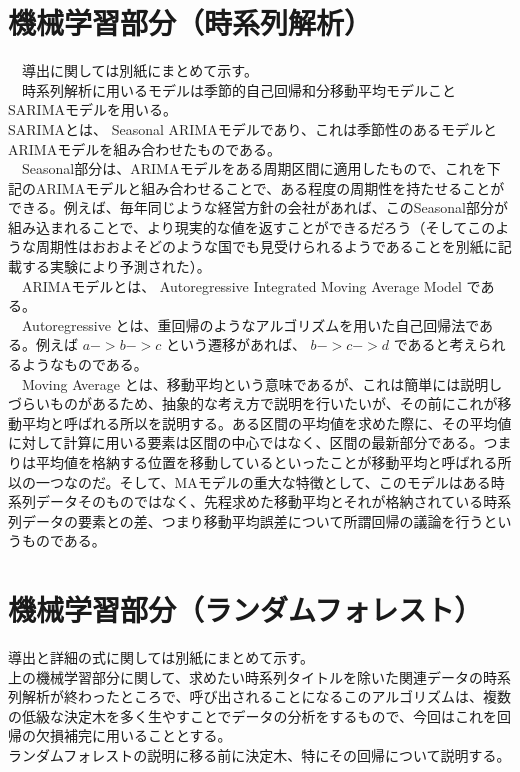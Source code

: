 \documentclass{scrartcl}
\begin{document}
\section{機械学習部分（時系列解析）}
\label{sec:org7977ed6}
  　導出に関しては別紙にまとめて示す。\\
  　時系列解析に用いるモデルは季節的自己回帰和分移動平均モデルことSARIMAモデルを用いる。\\
SARIMAとは、 Seasonal ARIMAモデルであり、これは季節性のあるモデルとARIMAモデルを組み合わせたものである。\\
  　Seasonal部分は、ARIMAモデルをある周期区間に適用したもので、これを下記のARIMAモデルと組み合わせることで、ある程度の周期性を持たせることができる。例えば、毎年同じような経営方針の会社があれば、このSeasonal部分が組み込まれることで、より現実的な値を返すことができるだろう（そしてこのような周期性はおおよそどのような国でも見受けられるようであることを別紙に記載する実験により予測された）。\\
  　ARIMAモデルとは、 Autoregressive Integrated Moving Average Model である。\\
  　Autoregressive とは、重回帰のようなアルゴリズムを用いた自己回帰法である。例えば \(a->b->c\) という遷移があれば、 \(b->c->d\) であると考えられるようなものである。\\
  　Moving Average とは、移動平均という意味であるが、これは簡単には説明しづらいものがあるため、抽象的な考え方で説明を行いたいが、その前にこれが移動平均と呼ばれる所以を説明する。ある区間の平均値を求めた際に、その平均値に対して計算に用いる要素は区間の中心ではなく、区間の最新部分である。つまりは平均値を格納する位置を移動しているといったことが移動平均と呼ばれる所以の一つなのだ。そして、MAモデルの重大な特徴として、このモデルはある時系列データそのものではなく、先程求めた移動平均とそれが格納されている時系列データの要素との差、つまり移動平均誤差について所謂回帰の議論を行うというものである。\\

\section{機械学習部分（ランダムフォレスト）}
\label{sec:org2b41fe8}
導出と詳細の式に関しては別紙にまとめて示す。\\
上の機械学習部分に関して、求めたい時系列タイトルを除いた関連データの時系列解析が終わったところで、呼び出されることになるこのアルゴリズムは、複数の低級な決定木を多く生やすことでデータの分析をするもので、今回はこれを回帰の欠損補完に用いることとする。\\
ランダムフォレストの説明に移る前に決定木、特にその回帰について説明する。\\
\end{document}
